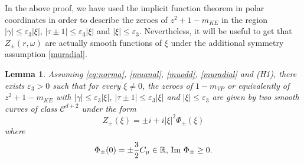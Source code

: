 \documentclass[11pt]{amsart}
\numberwithin{equation}{section}
\newtheorem{lem}{Lemma}[section]
\newcommand{\eps}{\varepsilon}
\begin{document}
In the above proof, we have used the implicit function theorem in polar coordinates in order to describe the zeroes
 of $z^2 + 1  - m_{KE}$ in the region $|\gamma | \leq \eps_{3} | \xi|$, $ | \tau \pm 1| \leq \eps_3|\xi| $ and $|\xi | \leq \eps_{3}$.
 Nevertheless, it will be useful to get that $Z_{\pm}(r, \omega)$ are actually smooth functions of $\xi$
 under the additional symmetry assumption \eqref{muradial}.
 \begin{lem}
 \label{lemsmooth}
   Assuming  \eqref{eq:norma}, \eqref{muanal}, \eqref{muodd}, \eqref{muradial} and (H1), there exists $\eps_{3}>0$ such that for every $\xi \neq 0$, the zeroes
of $1-m_{VP}$  or equivalently of $ z^2  + 1 - m_{KE}$  with $|\gamma | \leq \eps_{3} | \xi|$, $ | \tau \pm 1 | \leq \eps_3|\xi| $ and $|\xi | \leq \eps_{3}$ are given by two 
  smooth curves of class $\mathscr{C}^{d+2}$  under the form 
     $$ Z_{\pm}(\xi) = \pm i + i |\xi|^2 \Phi_{\pm}(\xi)$$
    where
    $$ \Phi_{\pm}(0) = \pm {3 \over 2} C_{\mu} \in \mathbb{R},  \,   \operatorname{Im} \, \Phi_{\pm} \geq 0.$$
 \end{lem}
\end{document}
